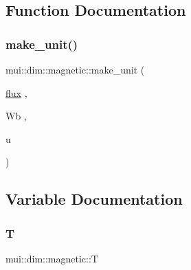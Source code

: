 \subsection{Function Documentation}
\mbox{\label{namespacemui_1_1dim_1_1magnetic_a476b630da1c8182a9e3fc97ab6407763}} 
\subsubsection{\texorpdfstring{make\+\_\+unit()}{make\_unit()}}
{\footnotesize\ttfamily mui\+::dim\+::magnetic\+::make\+\_\+unit (\begin{DoxyParamCaption}\item[{\hyperlink{namespacemui_1_1dim_1_1magnetic_af16e4663d0ff988de3b2e2ea62fe35cc}{flux}}]{,  }\item[{Wb}]{,  }\item[{u}]{ }\end{DoxyParamCaption})}



\subsection{Variable Documentation}
\mbox{\label{namespacemui_1_1dim_1_1magnetic_a096e4445368349b6ee972688bd4cf705}} 
\subsubsection{\texorpdfstring{T}{T}}
{\footnotesize\ttfamily mui\+::dim\+::magnetic\+::T}

